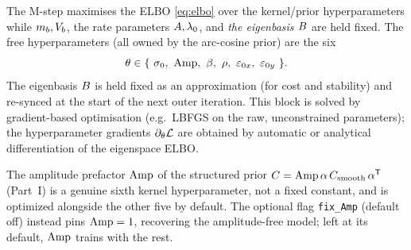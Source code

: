 The M-step maximises the ELBO \eqref{eq:elbo} over the kernel/prior
hyperparameters while $m_{b},V_{b}$, the rate parameters $A,\lambda_{0}$, and
\emph{the eigenbasis $B$} are held fixed. The free hyperparameters (all owned
by the arc-cosine prior) are the six
\begin{equation}
\theta\in\{\ \sigz,\ \Amp,\ \bwid,\ \smoo,\ \varepsilon_{0x},\ \varepsilon_{0y}\ \}.
\end{equation}
The eigenbasis $B$ is held fixed as an approximation (for cost and stability)
and re-synced at the start of the next outer iteration. This block is solved by
gradient-based optimisation (e.g.\ LBFGS on the raw, unconstrained parameters);
the hyperparameter gradients $\partial_\theta\mathcal{L}$ are obtained by automatic or
analytical differentiation of the eigenspace ELBO.

\begin{remark}
The amplitude prefactor $\mathrm{Amp}$ of the structured prior
$C=\mathrm{Amp}\,\alpha\,C_{\mathrm{smooth}}\,\alpha^{\mathsf{T}}$ (Part~I) is a genuine sixth kernel
hyperparameter, not a fixed constant, and is optimized alongside the other five
by default. The optional flag \texttt{fix\_Amp} (default off) instead pins
$\mathrm{Amp}=1$, recovering the amplitude-free model; left at its default, $\mathrm{Amp}$ trains
with the rest.
\end{remark}
